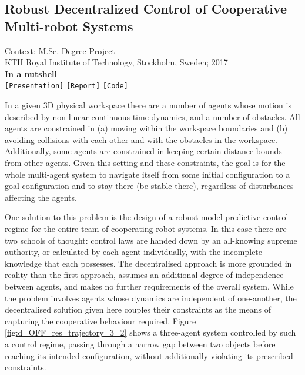 \subsection{Robust Decentralized Control of Cooperative Multi-robot Systems}

\noindent Context: M.Sc. Degree Project\\
\noindent KTH Royal Institute of Technology, Stockholm, Sweden; 2017\\

\noindent \textbf{In a nutshell}\\
\noindent\href{https://github.com/li9i/KTH_thesis_presentation}{\texttt{[Presentation]}} \href{https://github.com/li9i/KTH_thesis_presentation}{\texttt{[Report]}}  \href{https://github.com/li9i/KTH_thesis_simulations}{\texttt{[Code]}} \\

\begin{problem}
In a given 3D physical workspace there are a number of agents whose motion is
described by non-linear continuous-time dynamics, and a number of obstacles.
All agents are constrained in (a) moving within the workspace boundaries and
(b) avoiding collisions with each other and with the obstacles in the
workspace. Additionally, some agents are constrained in keeping certain
distance bounds from other agents. Given this setting and these constraints,
the goal is for the whole multi-agent system to navigate itself from some
initial configuration to a goal configuration and to stay there (be stable
there), regardless of disturbances affecting the agents.
\end{problem}

One solution to this problem is the design of a robust model predictive control
regime for the entire team of cooperating robot systems. In this case there are
two schools of thought: control laws are handed down by an all-knowing supreme
authority, or calculated by each agent individually, with the incomplete
knowledge that each possesses. The decentralised approach is more grounded in
reality than the first approach, assumes an additional degree of independence
between agents, and makes no further requirements of the overall system. While
the problem involves agents whose dynamics are independent of one-another, the
decentralised solution given here couples their constraints as the means of
capturing the cooperative behaviour required.  Figure
\ref{fig:d_OFF_res_trajectory_3_2} shows a three-agent system controlled by
such a control regime, passing through a narrow gap between two objects before
reaching its intended configuration, without additionally violating its
prescribed constraints.

